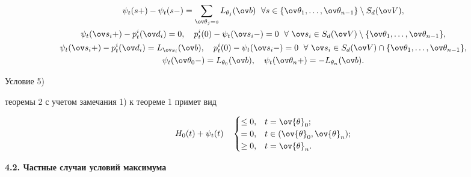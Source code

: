 \begin{gather*}


\psi_t(s+)-\psi_t(s-)=


\sum_{\ov\theta_j=s}L_{\theta_j}(\ov b)


\ \; \forall s\in\{\ov\theta_1,\dotsc,\ov\theta_{n-1}\}\setminus


S_d(\ov V), \\


%


\psi_t(\ov


s_i+)-p_t^i(\ov d_i)=0, \quad p_t^i(0)-\psi_t(\ov s_i-)=0


\ \; \forall\ \ov s_i\in S_d(\ov V)\setminus\{


\ov\theta_1, \dotsc, \ov\theta_{n-1}\}, \\


%


\psi_t(\ov s_i+)-p_t^i(\ov


d_i)=L_{\ov s_i}(\ov b),\quad p_t^i(0)-\psi_t(\ov


s_i-)=0


\ \; \forall\ \ov s_i\in S_d(\ov V)\cap\{


\ov\theta_1, \dotsc,


\ov\theta_{n-1}\}, \\


\psi_t(\ov\theta_0-)=L_{\theta_0}(\ov b),\quad


\psi_t(\ov\theta_n+)=-L_{\theta_n}(\ov b).


\end{gather*}


Условие 5)


теоремы 2 с учетом замечания 1) к теореме 1 примет вид


$$


H_0(t)+\psi_t(t)\quad


\begin{cases}


\leq 0, & {t}=\ov{\theta}_0; \\


= 0, & {t} \in (\ov{\theta}_0,\ov{\theta}_n); \\


\geq 0, & {t}=\ov{\theta}_n.


\end{cases}


$$





\begin{center}{\bf 4.2. Частные случаи условий максимума}


\end{center}


